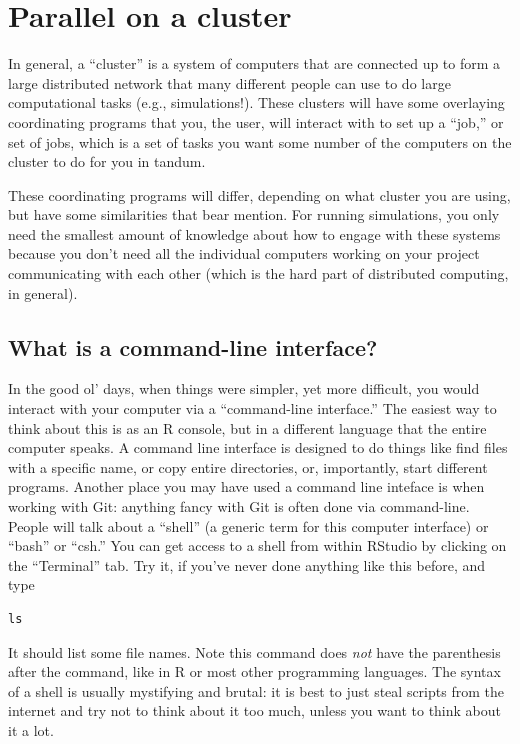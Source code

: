\documentclass[
]{book}
\begin{document}
\section{Parallel on a cluster}\label{parallel-on-a-cluster}

In general, a ``cluster'' is a system of computers that are connected up to form a large distributed network that many different people can use to do large computational tasks (e.g., simulations!).
These clusters will have some overlaying coordinating programs that you, the user, will interact with to set up a ``job,'' or set of jobs, which is a set of tasks you want some number of the computers on the cluster to do for you in tandum.

These coordinating programs will differ, depending on what cluster you are using, but have some similarities that bear mention.
For running simulations, you only need the smallest amount of knowledge about how to engage with these systems because you don't need all the individual computers working on your project communicating with each other (which is the hard part of distributed computing, in general).

\subsection{What is a command-line interface?}\label{what-is-a-command-line-interface}

In the good ol' days, when things were simpler, yet more difficult, you would interact with your computer via a ``command-line interface.''
The easiest way to think about this is as an R console, but in a different language that the entire computer speaks.
A command line interface is designed to do things like find files with a specific name, or copy entire directories, or, importantly, start different programs.
Another place you may have used a command line inteface is when working with Git: anything fancy with Git is often done via command-line.
People will talk about a ``shell'' (a generic term for this computer interface) or ``bash'' or ``csh.''
You can get access to a shell from within RStudio by clicking on the ``Terminal'' tab.
Try it, if you've never done anything like this before, and type

\begin{verbatim}
ls
\end{verbatim}

It should list some file names.
Note this command does \emph{not} have the parenthesis after the command, like in R or most other programming languages.
The syntax of a shell is usually mystifying and brutal: it is best to just steal scripts from the internet and try not to think about it too much, unless you want to think about it a lot.
\end{document}
